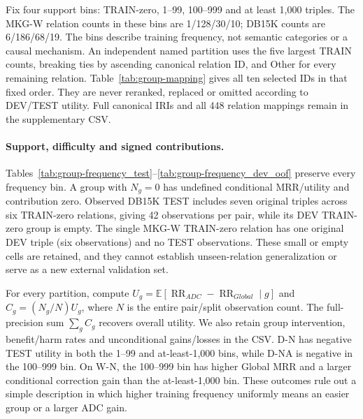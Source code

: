 \documentclass[11pt,a4paper]{article}
\newcommand{\RR}{\operatorname{RR}}
\newcommand{\E}{\mathbb{E}}
\begin{document}
Fix four support bins: TRAIN-zero, 1--99, 100--999 and at least 1,000 triples. The MKG-W relation counts in these bins are 1/128/30/10; DB15K counts are 6/186/68/19. The bins describe training frequency, not semantic categories or a causal mechanism. An independent named partition uses the five largest TRAIN counts, breaking ties by ascending canonical relation ID, and Other for every remaining relation. Table~\ref{tab:group-mapping} gives all ten selected IDs in that fixed order. They are never reranked, replaced or omitted according to DEV/TEST utility. Full canonical IRIs and all 448 relation mappings remain in the supplementary CSV.

\FloatBarrier

\paragraph{Support, difficulty and signed contributions.}
Tables~\ref{tab:group-frequency_test}--\ref{tab:group-frequency_dev_oof} preserve every frequency bin. A group with $N_g=0$ has undefined conditional MRR/utility and contribution zero. Observed DB15K TEST includes seven original triples across six TRAIN-zero relations, giving 42 observations per pair, while its DEV TRAIN-zero group is empty. The single MKG-W TRAIN-zero relation has one original DEV triple (six observations) and no TEST observations. These small or empty cells are retained, and they cannot establish unseen-relation generalization or serve as a new external validation set.

For every partition, compute $U_g=\E[\RR_{ADC}-\RR_{Global}\mid g]$ and $C_g=(N_g/N)U_g$, where $N$ is the entire pair/split observation count. The full-precision sum $\sum_g C_g$ recovers overall utility. We also retain group intervention, benefit/harm rates and unconditional gains/losses in the CSV. D-N has negative TEST utility in both the 1--99 and at-least-1,000 bins, while D-NA is negative in the 100--999 bin. On W-N, the 100--999 bin has higher Global MRR and a larger conditional correction gain than the at-least-1,000 bin. These outcomes rule out a simple description in which higher training frequency uniformly means an easier group or a larger ADC gain.


\FloatBarrier
\end{document}
